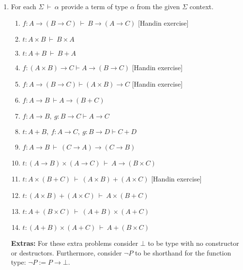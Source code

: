 \documentclass[11pt]{report}
\begin{document}
\begin{enumerate}
	\item For each $\Sigma \ \vdash \ \alpha$ provide a term of type $\alpha$ from the given $\Sigma$ context. 
	\begin{enumerate}
		\item $f : A \to (B \to C) \ \vdash \ B \to (A \to C)$ \hfill [Handin exercise]
		\item $t : A \times B \ \vdash \ B \times A$
		\item $t : A + B \ \vdash \ B + A$ 
		\item $f : (A\times  B) \rightarrow  C \vdash  A\rightarrow ( B \rightarrow  C) $ \hfill [Handin exercise]
		\item $f : A \rightarrow ( B \rightarrow  C) \vdash ( A\times  B) \rightarrow C$	 \hfill [Handin exercise]
		\item $f : A \to B \ \vdash A \to (B + C)$
		\item $ f : A\rightarrow  B, \  g : B \rightarrow  C \vdash  A\rightarrow  C $
		\item $t : A +  B, \  f : A\to  C, \  g : B \to  D \vdash   C +  D$		
		\item $f : A \to B \ \vdash \ (C \to A) \to (C \to B)$	
		\item $t : (A \to B) \times (A \to C) \ \vdash \ A \to (B \times C)$
		\item $t : A \times (B + C) \ \vdash \ (A \times B) + (A \times C)$ \hfill [Handin exercise]
		\item $t : (A \times B) + (A \times C) \ \vdash \ A \times (B + C)$
		\item $t : A + (B \times C) \ \vdash \ (A + B) \times (A + C)$
		\item $t : (A + B) \times (A + C) \ \vdash \ A + (B \times C)$
	\end{enumerate}
	
		{\bf Extras:} For these extra problems consider $\bot$ to be type with no constructor or destructors. Furthermore, consider $\lnot P$ to be shorthand for the function type: $\lnot P:= P \to \bot$.


\end{enumerate}
\end{document}
